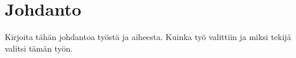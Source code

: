 \chapter{Johdanto}
\label{ch:johdanto}
Kirjoita tähän johdantoa työstä ja aiheesta. Kuinka työ valittiin ja miksi tekijä valitsi tämän työn.